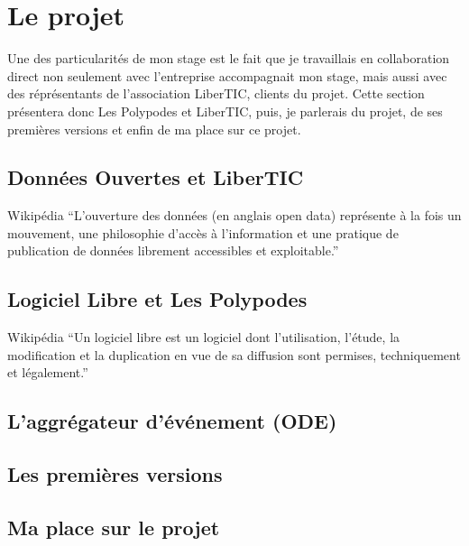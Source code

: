 \section{Le projet}

Une des particularités de mon stage est le fait que je travaillais en collaboration direct non seulement avec l'entreprise accompagnait mon stage, mais aussi avec des réprésentants de l'association LiberTIC, clients du projet. Cette section présentera donc Les Polypodes et LiberTIC, puis, je parlerais du projet, de ses premières versions et enfin de ma place sur ce projet.

\subsection{Données Ouvertes et LiberTIC}

\begin{aquote}{Wikipédia}
``L'ouverture des données (en anglais open data) représente à la fois un mouvement, une philosophie d'accès à l'information et une pratique de publication de données librement accessibles et exploitable.''
\end{aquote}

\subsection{Logiciel Libre et Les Polypodes}

\begin{aquote}{Wikipédia}
``Un logiciel libre est un logiciel dont l'utilisation, l'étude, la modification et la duplication en vue de sa diffusion sont permises, techniquement et légalement.''
\end{aquote}

\subsection{L'aggrégateur d'événement (ODE)}

\subsection{Les premières versions}

\subsection{Ma place sur le projet}